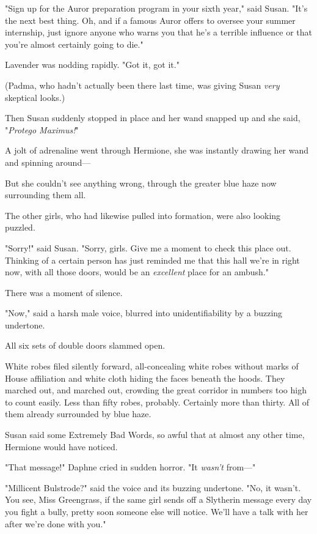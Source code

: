 "Sign up for the Auror preparation program in your sixth year," said Susan.
"It's the next best thing. Oh, and if a famous Auror offers to oversee your
summer internship, just ignore anyone who warns you that he's a terrible
influence or that you're almost certainly going to die."

Lavender was nodding rapidly. "Got it, got it."

(Padma, who hadn't actually been there last time, was giving Susan \emph{very}
skeptical looks.)

Then Susan suddenly stopped in place and her wand snapped up and she said,
"\emph{Protego Maximus!}"

A jolt of adrenaline went through Hermione, she was instantly drawing her wand
and spinning around---

But she couldn't see anything wrong, through the greater blue haze now
surrounding them all.

The other girls, who had likewise pulled into formation, were also looking
puzzled.

"Sorry!" said Susan. "Sorry, girls. Give me a moment to check this place out.
Thinking of a certain person has just reminded me that this hall we're in right
now, with all those doors, would be an \emph{excellent} place for an ambush."

There was a moment of silence.

"Now," said a harsh male voice, blurred into unidentifiability by a buzzing
undertone.

All six sets of double doors slammed open.

White robes filed silently forward, all-concealing white robes without marks of
House affiliation and white cloth hiding the faces beneath the hoods. They
marched out, and marched out, crowding the great corridor in numbers too high
to count easily. Less than fifty robes, probably. Certainly more than thirty.
All of them already surrounded by blue haze.

Susan said some Extremely Bad Words, so awful that at almost any other time,
Hermione would have noticed.

"That message!" Daphne cried in sudden horror. "It \emph{wasn't} from\mbox{---}"

"Millicent Bulstrode?" said the voice and its buzzing undertone. "No, it
wasn't. You see, Miss Greengrass, if the same girl sends off a Slytherin
message every day you fight a bully, pretty soon someone else will notice.
We'll have a talk with her after we're done with you."

